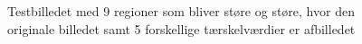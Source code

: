 \begin{figure}[!h]
{       \label{0,0015}}
    \caption{Testbilledet med 9 regioner som bliver støre og støre, hvor den originale billedet samt 5 forskellige tærskelværdier er afbilledet}
    \label{stoerelse_sammenlining}
\end{figure} 
